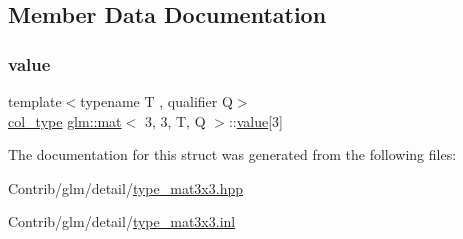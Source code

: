 \subsection{Member Data Documentation}
\mbox{\label{structglm_1_1mat_3_013_00_013_00_01_t_00_01_q_01_4_a505193d8cb434f9d92dafb3108e39452}} 
\subsubsection{\texorpdfstring{value}{value}}
{\footnotesize\ttfamily template$<$typename T , qualifier Q$>$ \\
\mbox{\hyperlink{structglm_1_1mat_3_013_00_013_00_01_t_00_01_q_01_4_a4d84bef3685131dbb0ac43cac0a3b147}{col\+\_\+type}} \mbox{\hyperlink{structglm_1_1mat}{glm\+::mat}}$<$ 3, 3, T, Q $>$\+::\mbox{\hyperlink{_s_d_l__opengl__glext_8h_a8ad81492d410ff2ac11f754f4042150f}{value}}\mbox{[}3\mbox{]}\hspace{0.3cm}{\ttfamily [private]}}



The documentation for this struct was generated from the following files\+:\begin{DoxyCompactItemize}
\item 
Contrib/glm/detail/\mbox{\hyperlink{type__mat3x3_8hpp}{type\+\_\+mat3x3.\+hpp}}\item 
Contrib/glm/detail/\mbox{\hyperlink{type__mat3x3_8inl}{type\+\_\+mat3x3.\+inl}}\end{DoxyCompactItemize}

